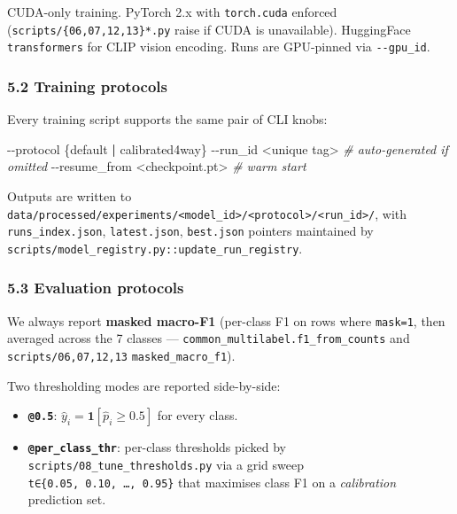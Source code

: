 \documentclass[
  11pt,
]{article}
\newenvironment{Shaded}{}{}
\newcommand{\CommentTok}[1]{\textcolor[rgb]{0.38,0.63,0.69}{\textit{#1}}}
\newcommand{\ExtensionTok}[1]{#1}
\newcommand{\KeywordTok}[1]{\textcolor[rgb]{0.00,0.44,0.13}{\textbf{#1}}}
\newcommand{\NormalTok}[1]{#1}
\newcommand{\OperatorTok}[1]{\textcolor[rgb]{0.40,0.40,0.40}{#1}}
\providecommand{\tightlist}{%
  \setlength{\itemsep}{0pt}\setlength{\parskip}{0pt}}
\begin{document}
CUDA-only training. PyTorch 2.x with \texttt{torch.cuda} enforced
(\texttt{scripts/\{06,07,12,13\}*.py} raise if CUDA is unavailable).
HuggingFace \texttt{transformers} for CLIP vision encoding. Runs are
GPU-pinned via \texttt{-\/-gpu\_id}.

\subsubsection{5.2 Training protocols}\label{training-protocols}

Every training script supports the same pair of CLI knobs:

\begin{Shaded}
\begin{Highlighting}[]
\ExtensionTok{{-}{-}protocol}\NormalTok{  \{default }\KeywordTok{|} \ExtensionTok{calibrated4way\}}
\ExtensionTok{{-}{-}run\_id}    \OperatorTok{\textless{}}\NormalTok{unique tag}\OperatorTok{\textgreater{}}             \CommentTok{\# auto{-}generated if omitted}
\ExtensionTok{{-}{-}resume\_from} \OperatorTok{\textless{}}\NormalTok{checkpoint.pt}\OperatorTok{\textgreater{}}        \CommentTok{\# warm start}
\end{Highlighting}
\end{Shaded}

Outputs are written to
\texttt{data/processed/experiments/\textless{}model\_id\textgreater{}/\textless{}protocol\textgreater{}/\textless{}run\_id\textgreater{}/},
with \texttt{runs\_index.json}, \texttt{latest.json}, \texttt{best.json}
pointers maintained by
\texttt{scripts/model\_registry.py::update\_run\_registry}.

\subsubsection{5.3 Evaluation protocols}\label{evaluation-protocols}

We always report \textbf{masked macro-F1} (per-class F1 on rows where
\texttt{mask=1}, then averaged across the 7 classes ---
\texttt{common\_multilabel.f1\_from\_counts} and
\texttt{scripts/06,07,12,13} \texttt{masked\_macro\_f1}).

Two thresholding modes are reported side-by-side:

\begin{itemize}
\tightlist
\item
  \textbf{\texttt{@0.5}}: \(\hat y_i=\mathbf{1}[\hat p_i\ge 0.5]\) for
  every class.
\item
  \textbf{\texttt{@per\_class\_thr}}: per-class thresholds picked by
  \texttt{scripts/08\_tune\_thresholds.py} via a grid sweep
  \texttt{t∈\{0.05,\ 0.10,\ …,\ 0.95\}} that maximises class F1 on a
  \emph{calibration} prediction set.
\end{itemize}
\end{document}
